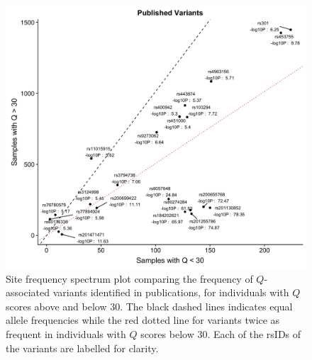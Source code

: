 \documentclass[9pt,lineno]{elife}
\begin{document}
\begin{figure}[h]
\centering
\includegraphics[width=15cm,keepaspectratio]{./Figures/Published_OverUnder30.jpg}
\caption{Site frequency spectrum plot comparing the frequency of $Q$-associated variants identified in publications, for individuals with $Q$ scores above and below 30. The black dashed lines indicates equal allele frequencies while the red dotted line for variants twice as frequent in individuals with $Q$ scores below 30. Each of the rsIDs of the variants are labelled for clarity.}  
\label{Pub_30}
\end{figure}
\end{document}

